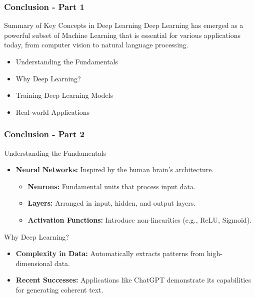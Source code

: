 \documentclass[aspectratio=169]{beamer}
\begin{document}
\begin{frame}[fragile]
    \frametitle{Conclusion - Part 1}
    \begin{block}{Summary of Key Concepts in Deep Learning}
        Deep Learning has emerged as a powerful subset of Machine Learning that is essential for various applications today, from computer vision to natural language processing.
    \end{block}
    \begin{itemize}
        \item Understanding the Fundamentals
        \item Why Deep Learning?
        \item Training Deep Learning Models
        \item Real-world Applications
    \end{itemize}
\end{frame}

\begin{frame}[fragile]
    \frametitle{Conclusion - Part 2}
    \begin{block}{Understanding the Fundamentals}
        \begin{itemize}
            \item \textbf{Neural Networks:} Inspired by the human brain's architecture.
                \begin{itemize}
                    \item \textbf{Neurons:} Fundamental units that process input data.
                    \item \textbf{Layers:} Arranged in input, hidden, and output layers.
                    \item \textbf{Activation Functions:} Introduce non-linearities (e.g., ReLU, Sigmoid).
                \end{itemize}
        \end{itemize}
    \end{block}

    \begin{block}{Why Deep Learning?}
        \begin{itemize}
            \item \textbf{Complexity in Data:} Automatically extracts patterns from high-dimensional data.
            \item \textbf{Recent Successes:} Applications like ChatGPT demonstrate its capabilities for generating coherent text.
        \end{itemize}
    \end{block}
\end{frame}
\end{document}
